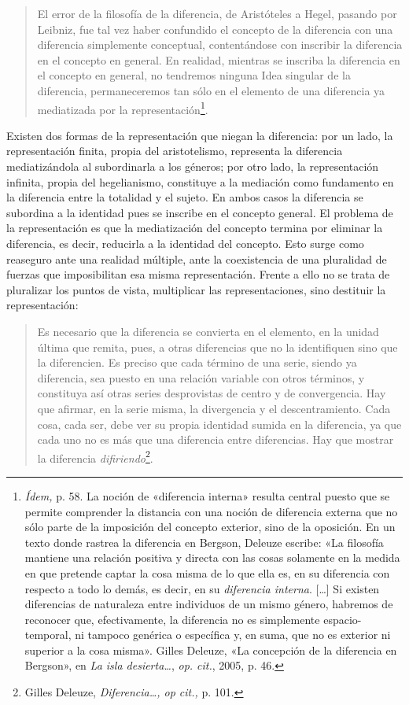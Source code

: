 \begin{quote}
El error de la filosofía de la diferencia, de Aristóteles a Hegel, pasando por Leibniz, fue tal vez haber confundido el concepto de la diferencia con una diferencia simplemente conceptual, contentándose con inscribir la diferencia en el concepto en general. En realidad, mientras se inscriba la diferencia en el concepto en general, no tendremos ninguna Idea singular de la diferencia, permaneceremos tan sólo en el elemento de una diferencia ya mediatizada por la representación\footnote{\emph{Ídem,} p. 58. La noción de «diferencia interna» resulta central puesto que se permite comprender la distancia con una noción de diferencia externa que no sólo parte de la imposición del concepto exterior, sino de la oposición. En un texto donde rastrea la diferencia en Bergson, Deleuze escribe: «La filosofía mantiene una relación positiva y directa con las cosas solamente en la medida en que pretende captar la cosa misma de lo que ella es, en su diferencia con respecto a todo lo demás, es decir, en su \emph{diferencia interna}. {[}\ldots{]} Si existen diferencias de naturaleza entre individuos de un mismo género, habremos de reconocer que, efectivamente, la diferencia no es simplemente espacio-temporal, ni tampoco genérica o específica y, en suma, que no es exterior ni superior a la cosa misma». Gilles Deleuze, «La concepción de la diferencia en Bergson», en \emph{La isla desierta\ldots{}}, \emph{op. cit.}, 2005, p. 46.}.
\end{quote}

Existen dos formas de la representación que niegan la diferencia: por un lado, la representación finita, propia del aristotelismo, representa la diferencia mediatizándola al subordinarla a los géneros; por otro lado, la representación infinita, propia del hegelianismo, constituye a la mediación como fundamento en la diferencia entre la totalidad y el sujeto. En ambos casos la diferencia se subordina a la identidad pues se inscribe en el concepto general. El problema de la representación es que la mediatización del concepto termina por eliminar la diferencia, es decir, reducirla a la identidad del concepto. Esto surge como reaseguro ante una realidad múltiple, ante la coexistencia de una pluralidad de fuerzas que imposibilitan esa misma representación. Frente a ello no se trata de pluralizar los puntos de vista, multiplicar las representaciones, sino destituir la representación:

\begin{quote}
Es necesario que la diferencia se convierta en el elemento, en la unidad última que remita, pues, a otras diferencias que no la identifiquen sino que la diferencien. Es preciso que cada término de una serie, siendo ya diferencia, sea puesto en una relación variable con otros términos, y constituya así otras series desprovistas de centro y de convergencia. Hay que afirmar, en la serie misma, la divergencia y el descentramiento. Cada cosa, cada ser, debe ver su propia identidad sumida en la diferencia, ya que cada uno no es más que una diferencia entre diferencias. Hay que mostrar la diferencia \emph{difiriendo}\footnote{Gilles Deleuze, \emph{Diferencia\ldots, op cit.,} p. 101.}.
\end{quote}

